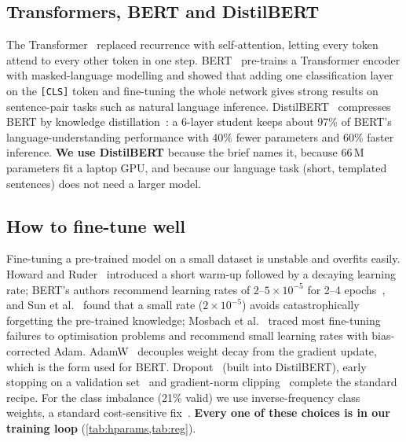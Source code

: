 \documentclass[12pt,a4paper]{article}
\newcommand{\code}[1]{\texttt{#1}}
\begin{document}
\subsection{Transformers, BERT and DistilBERT}
The Transformer~\cite{vaswani2017} replaced recurrence with self-attention, letting every token attend to every other token
in one step. BERT~\cite{devlin2019} pre-trains a Transformer encoder with masked-language modelling and showed that
adding one classification layer on the \code{[CLS]} token and fine-tuning the whole network gives strong results on
sentence-pair tasks such as natural language inference. DistilBERT~\cite{sanh2019} compresses BERT by knowledge
distillation~\cite{hinton2015}: a 6-layer student keeps about 97\% of BERT's language-understanding performance with 40\%
fewer parameters and 60\% faster inference. \textbf{We use DistilBERT} because the brief names it, because 66\,M parameters
fit a laptop GPU, and because our language task (short, templated sentences) does not need a larger model.

\subsection{How to fine-tune well}
Fine-tuning a pre-trained model on a small dataset is unstable and overfits easily. Howard and Ruder~\cite{howard2018}
introduced a short warm-up followed by a decaying learning rate; BERT's authors recommend learning rates of
$2\text{--}5\times10^{-5}$ for 2--4 epochs~\cite{devlin2019}, and Sun et al.~\cite{sun2019} found that a small rate
($2\times10^{-5}$) avoids catastrophically forgetting the pre-trained knowledge; Mosbach et al.~\cite{mosbach2021} traced
most fine-tuning failures to optimisation problems and recommend small learning rates with bias-corrected Adam.
AdamW~\cite{loshchilov2019} decouples weight decay from the gradient update, which is the form used for BERT.
Dropout~\cite{srivastava2014} (built into DistilBERT), early stopping on a validation set~\cite{prechelt1998} and
gradient-norm clipping~\cite{pascanu2013} complete the standard recipe. For the class imbalance (21\% valid) we use
inverse-frequency class weights, a standard cost-sensitive fix~\cite{he2009}. \textbf{Every one of these choices is in
our training loop} (\cref{tab:hparams,tab:reg}).
\end{document}
